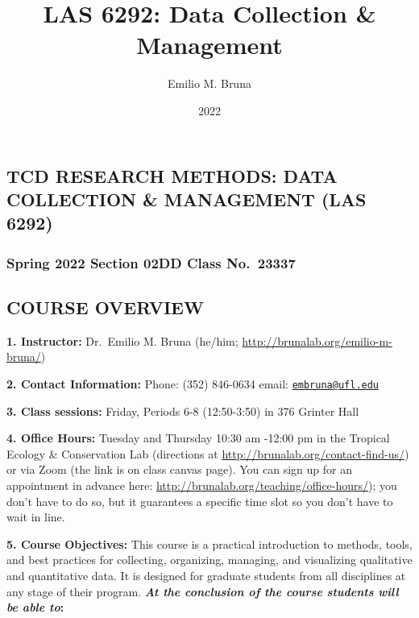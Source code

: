 \documentclass[
  12pt,
]{article}
\title{LAS 6292: Data Collection \& Management}
\author{Emilio M. Bruna}
\date{2022}
\begin{document}
\maketitle

\thispagestyle{empty}

\hypertarget{tcd-research-methods-data-collection-management-las-6292}{%
\subsection{\texorpdfstring{\textbf{TCD RESEARCH METHODS: DATA
COLLECTION \& MANAGEMENT (LAS
6292)}}{TCD RESEARCH METHODS: DATA COLLECTION \& MANAGEMENT (LAS 6292)}}\label{tcd-research-methods-data-collection-management-las-6292}}

\hypertarget{spring-2022-section-02dd-class-no.-23337}{%
\subsubsection{\texorpdfstring{\textbf{Spring 2022 \textbar{} Section
02DD \textbar{} Class
No.~23337}}{Spring 2022 \textbar{} Section 02DD \textbar{} Class No.~23337}}\label{spring-2022-section-02dd-class-no.-23337}}

\hypertarget{course-overview}{%
\subsection{COURSE OVERVIEW}\label{course-overview}}

\textbf{1. Instructor:} Dr.~Emilio M. Bruna (he/him;
\url{http://brunalab.org/emilio-m-bruna/})

\textbf{2. Contact Information:} Phone: (352) 846-0634 \textbar{} email:
\href{mailto:embruna@ufl.edu}{\nolinkurl{embruna@ufl.edu}}

\textbf{3. Class sessions:} Friday, Periods 6-8 (12:50-3:50) in 376
Grinter Hall

\textbf{4. Office Hours:} Tuesday and Thursday 10:30 am -12:00 pm in the
Tropical Ecology \& Conservation Lab (directions at
\url{http://brunalab.org/contact-find-us/}) or via Zoom (the link is on
class canvas page). You can sign up for an appointment in advance here:
\url{http://brunalab.org/teaching/office-hours/}); you don't have to do
so, but it guarantees a specific time slot so you don't have to wait in
line.

\textbf{5. Course Objectives:} This course is a practical introduction
to methods, tools, and best practices for collecting, organizing,
managing, and visualizing qualitative and quantitative data. It is
designed for graduate students from all disciplines at any stage of
their program. \textbf{\emph{At the conclusion of the course students
will be able to}:}
\end{document}

